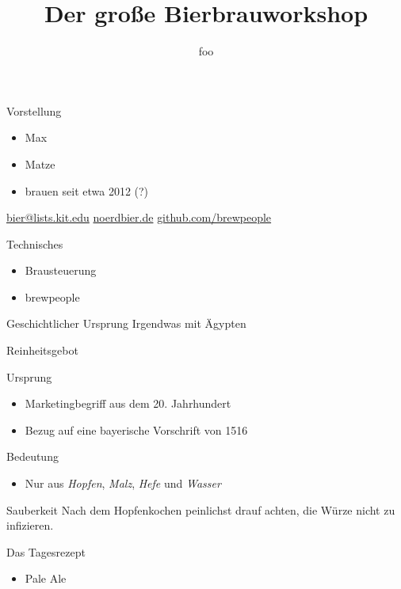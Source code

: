 \documentclass[18pt]{beamer}
\title{Der große Bierbrauworkshop}
\author{foo}
\begin{document}
\maketitle


\begin{frame}{Vorstellung}
  \begin{itemize}
    \item Max
    \item Matze
    \item brauen seit etwa 2012 (?)
  \end{itemize}
  \url{bier@lists.kit.edu}
  \url{noerdbier.de}
  \url{github.com/brewpeople}
\end{frame}
\begin{frame}{Technisches}
  \begin{itemize}
    \item Brausteuerung
    \item brewpeople
  \end{itemize}
\end{frame}
\begin{frame}{Geschichtlicher Ursprung}
  Irgendwas mit Ägypten
\end{frame}
\begin{frame}{Reinheitsgebot}
  \begin{block}{Ursprung}
    \begin{itemize}
      \item Marketingbegriff aus dem 20. Jahrhundert
      \item Bezug auf eine bayerische Vorschrift von 1516
    \end{itemize}
  \end{block}
  \begin{block}{Bedeutung}
    \begin{itemize}
      \item Nur aus \emph{Hopfen}, \emph{Malz}, \emph{Hefe} und \emph{Wasser}
    \end{itemize}
  \end{block}
\end{frame}
\begin{frame}{Sauberkeit}
  Nach dem Hopfenkochen peinlichst drauf achten, die Würze nicht zu infizieren.
\end{frame}
\begin{frame}{Das Tagesrezept}
  \begin{itemize}
    \item Pale Ale
  \end{itemize}
\end{frame}
\end{document}
